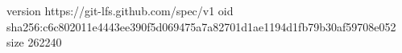version https://git-lfs.github.com/spec/v1
oid sha256:c6c802011e4443ee390f5d069475a7a82701d1ae1194d1fb79b30af59708e052
size 262240
